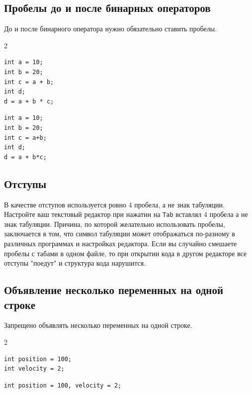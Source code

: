 \documentclass{article}
\begin{document}
\subsection*{Пробелы до и после бинарных операторов}
До и после бинарного оператора нужно обязательно ставить пробелы.
\vspace{-7mm}
\begin{multicols}{2}
\begin{lstlisting}[backgroundcolor = \color{correctcolor}]
int a = 10;
int b = 20;
int c = a + b;
int d;
d = a + b * c;
\end{lstlisting}

\begin{lstlisting}[backgroundcolor = \color{wrongcolor}]
int a = 10;
int b = 20;
int c = a+b;
int d;
d = a + b*c;
\end{lstlisting}
\end{multicols}


\subsection*{Отступы}
В качестве отступов используется ровно 4 пробела, а не знак табуляции.
Настройте ваш текстовый редактор при нажатии на \texttt{Tab} вставлял 4 пробела а не знак табуляции.
Причина, по которой желательно использовать пробелы, заключается в том, что символ табуляции может отображаться по-разному в различных программах и настройках редактора. Если вы случайно смешаете пробелы с табами в одном файле, то при открытии кода в другом редакторе все отступы "поедут"{} и структура кода нарушится.



\subsection*{Объявление несколько переменных на одной строке}
Запрещено объявлять несколько переменных на одной строке.
\vspace{-7mm}
\begin{multicols}{2}
\begin{lstlisting}[backgroundcolor = \color{correctcolor}]
int position = 100;
int velocity = 2;
\end{lstlisting}

\begin{lstlisting}[backgroundcolor = \color{wrongcolor}]
int position = 100, velocity = 2;
\end{lstlisting}
\end{multicols}
\end{document}
